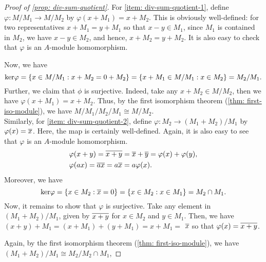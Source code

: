 \begin{proof}[Proof of \cref{prop: div-sum-quotient}]
    For \eqref{item: div-sum-quotient-1}, define $\varphi: M / M_{1} \rightarrow M / M_{2}$ by $\varphi\left(x+M_{1}\right)=x+M_{2}$. This is obviously well-defined: for two representatives $x+M_{1}=y+M_{1}$ so that $x-y \in M_{1}$, since $M_{1}$ is contained in $M_{2}$, we have $x-y \in M_{2}$, and hence, $x+M_{2}=y+M_{2}$. It is also easy to check that $\varphi$ is an $A$-module homomorphism.
    
    Now, we have 
    \[{\operatorname{\text{ker\/}}} \varphi=\left\{x \in M / M_{1}: x+M_{2}=0+M_{2}\right\}=\left\{x+M_{1} \in M / M_{1}: x \in M_{2}\right\}=M_{2} / M_{1}.\]
    Further, we claim that $\phi$ is surjective. Indeed, take any $x+M_{2} \in M / M_{2}$, then we have $\varphi\left(x+M_{1}\right) = x+M_{2}.$
    Thus, by the first isomorphism theorem (\cref{thm: first-iso-module}), we have
    $M / M_{1} / M_{2} / M_{1} \cong M / M_{2}$.\\
    
    Similarly, for \eqref{item: div-sum-quotient-2}, define  $\varphi: M_{2} \rightarrow (M_{1}+M_{2}) / M_{1}$ by $\varphi(x)=\overline{x}$. Here, the map is certainly well-defined. Again, it is also easy to see that $\varphi$ is an $A$-module homomorphism. 
    \[
    \begin{aligned}
        &\varphi(x+y)=\overline{x+y}=\overline{x}+\overline{y} = \varphi(x)+\varphi(y),\\
        &\varphi(ax)=\overline{ax}=a\overline{x} = a\varphi(x).
    \end{aligned}
    \] 
    Moreover, we have
    \[{\operatorname{\text{ker\/}}} \varphi=\left\{x \in M_{2}: \overline{x}=0\right\}=\left\{x \in M_{2}: x \in M_{1}\right\}=M_{2} \cap M_{1}.\]
    Now, it remains to show that $\varphi$ is surjective. Take any element in $(M_{1}+M_{2})/M_1$, given by $\overline{x+y}$ for $x \in M_{2}$ and $y \in M_{1}$. Then, we have
    $(x+y)+M_{1}=\left(x+M_{1}\right)+\left(y+M_{1}\right)=x+M_{1}=$ $\overline{x}$ so that $\varphi(x) = \overline{x+y}$.
    
    Again, by the first isomorphism theorem (\cref{thm: first-iso-module}), we have $\left(M_{1}+M_{2}\right) / M_{1} \cong M_{2} / M_{2} \cap M_{1}$,
\end{proof}

